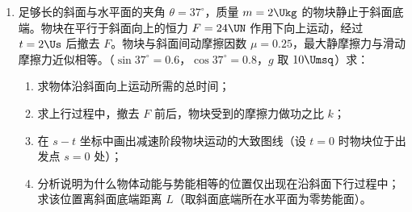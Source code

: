 \documentclass[\gkver]{gaokaozhenti}
\begin{document}
\begin{enumerate}
{（3）电键 S 闭合后，ab 棒受到向右的安培力，产生向右的加速度，棒向右加速运动。根据右手定则，棒中会产生一个向上的感应电动势，与电池电动势方向相反，导致棒中的电流减小，有

$F_{\text{安}} = BIL = B \cdot \frac{E - BLv}{R + r} \cdot L = ma$

由此式可知，随着 $v$ 的增加，$I$ 减小，$a$ 减小，棒做加速度减小的加速运动。

当 $E = BLv$ 时，$I = 0$，最后棒做匀速直线运动。

此过程中，电池的电能一部分转化为内电路和金属棒的内能，一部分转化为棒的动能。
}

\item
足够长的斜面与水平面的夹角 $\theta = 37^{\circ}$，质量 $m = 2\Ukg$ 的物块静止于斜面底端。物块在平行于斜面向上的恒力 $F = 24\UN$ 作用下向上运动，经过 $t = 2\Us$ 后撤去 $F$。物块与斜面间动摩擦因数 $\mu = 0.25$，最大静摩擦力与滑动摩擦力近似相等。（$\sin 37^{\circ} = 0.6$，$\cos 37^{\circ} = 0.8$，$g$ 取 $10\Umsq$）求：
\begin{enumerate}
	\item
	求物体沿斜面向上运动所需的总时间；
	\item
	求上行过程中，撤去 $F$ 前后，物块受到的摩擦力做功之比 $k$；
	\item
	在 $s-t$ 坐标中画出减速阶段物块运动的大致图线（设 $t = 0$ 时物块位于出发点 $s = 0$ 处）；
	\item
	分析说明为什么物体动能与势能相等的位置仅出现在沿斜面下行过程中；求该位置离斜面底端距离 $L$（取斜面底端所在水平面为零势能面）。
\end{enumerate}
\end{enumerate}
\end{document}
